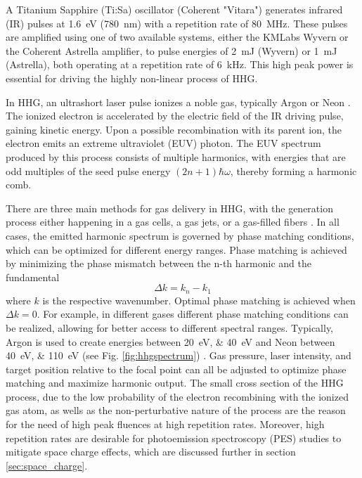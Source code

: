 A Titanium Sapphire (Ti:Sa) oscillator (Coherent "Vitara") generates infrared (IR) pulses at \qty{1.6}{\electronvolt} (\qty{780}{\nano\meter}) with a repetition rate of \qty{80}{\mega\hertz}. These pulses are amplified using one of two available systems, either the KMLabs Wyvern or the Coherent Astrella amplifier, to pulse energies of \qty{2}{\milli\joule} (Wyvern) or \qty{1}{\milli\joule} (Astrella), both operating at a repetition rate of \qty{6}{\kilo\hertz}.
This high peak power is essential for driving the highly non-linear process of HHG.

In HHG, an ultrashort laser pulse ionizes a noble gas, typically Argon or Neon \cite{rudawski_high-flux_2013}.
The ionized electron is accelerated by the electric field of the IR driving pulse, gaining kinetic energy.
Upon a possible recombination with its parent ion, the electron emits an extreme ultraviolet (EUV) photon.
The EUV spectrum produced by this process consists of multiple harmonics, with energies that are odd multiples of the seed pulse energy $(2n+1) \hbar\omega$, thereby forming a harmonic comb.

There are three main methods for gas delivery in HHG, with the generation process either happening in a gas cells, a gas jets, or a gas-filled fibers \cite{paul_quasi-phase-matched_2003, heckl_high_2009, sudmeyer_femtosecond_2008, roser_131w220fs_2005}.
In all cases, the emitted harmonic spectrum is governed by phase matching conditions, which can be optimized for different energy ranges.
Phase matching is achieved by minimizing the phase mismatch between the n-th harmonic and the fundamental
\begin{equation}
	\Delta k = k_n - k_1
\end{equation}
where $k$ is the respective wavenumber. 
Optimal phase matching is achieved when $\Delta k=0$.
For example, in different gases different phase matching conditions can be realized, allowing for better access to different spectral ranges.
Typically, Argon is used to create energies between \qtylist{20; 40}{\electronvolt} and Neon between \qtylist{40; 110}{\electronvolt} (see Fig. \ref{fig:hhgspectrum}) \cite{rudawski_high-flux_2013}.
Gas pressure, laser intensity, and target position relative to the focal point can all be adjusted to optimize phase matching and maximize harmonic output.
The small cross section of the HHG process, due to the low probability of the electron recombining with the ionized gas atom, as wells as the non-perturbative nature of the process are the reason for the need of high peak fluences at high repetition rates.
Moreover, high repetition rates are desirable for photoemission spectroscopy (PES) studies to mitigate space charge effects, which are discussed further in section \ref{sec:space_charge}.

